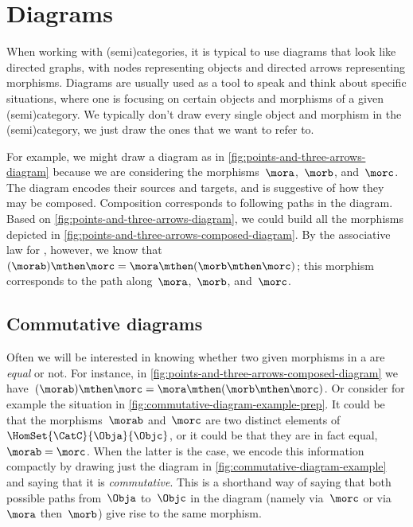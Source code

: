 
\section{Diagrams}

When working with (semi)categories, it is typical to use diagrams that look like directed graphs, with nodes representing objects and directed arrows representing morphisms.
Diagrams are usually used as a tool to speak and think about specific situations, where one is focusing on certain objects and morphisms of a given (semi)category.
We typically don't draw every single object and morphism in the (semi)category, we just draw the ones that we want to refer to.

\begin{marginfigure}
    \centering
    \caption{}
    \label{fig:points-and-three-arrows-diagram}
\end{marginfigure}

\begin{marginfigure}
    \centering
    \caption{}
    \label{fig:points-and-three-arrows-composed-diagram}
\end{marginfigure}

For example, we might draw a diagram as in \cref{fig:points-and-three-arrows-diagram} because we are considering the morphisms~$\mora$,~$\morb$, and~$\morc$.
The diagram encodes their sources and targets, and is suggestive of how they may be composed.
Composition corresponds to following paths in the diagram.
Based on \cref{fig:points-and-three-arrows-diagram}, we could build all the morphisms depicted in \cref{fig:points-and-three-arrows-composed-diagram}.
By the associative law for , however, we know that~$(\morab) \mthen \morc = \mora \mthen (\morb \mthen \morc)$;
this morphism corresponds to the path along~$\mora$,~$\morb$, and~$\morc$.

\subsection{Commutative diagrams}

Often we will be interested in knowing whether two given morphisms in a  are \emph{equal} or not.
For instance, in \cref{fig:points-and-three-arrows-composed-diagram} we have~$(\morab) \mthen \morc = \mora \mthen (\morb \mthen \morc)$.
Or consider for example the situation in \cref{fig:commutative-diagram-example-prep}.
It could be that the morphisms~$\morab$ and~$\morc$ are two distinct elements of~$\HomSet{\CatC}{\Obja}{\Objc}$, or it could be that they are in fact equal,~$\morab = \morc$.
When the latter is the case, we encode this information compactly by drawing just the diagram in \cref{fig:commutative-diagram-example} and saying that it is \emph{commutative}.
This is a shorthand way of saying that both possible paths from~$\Obja$ to~$\Objc$ in the diagram (namely via~$\morc$ or via~$\mora$ then~$\morb$) give rise to the same morphism.


